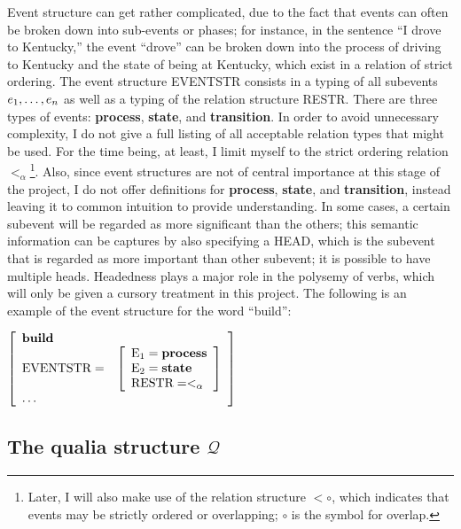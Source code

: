 \documentclass[12pt]{amsart}
\begin{document}
Event structure can get rather complicated, due to the fact that events can often be broken down into sub-events or phases; for instance, in the sentence ``I drove to Kentucky,'' the event ``drove'' can be broken down into the process of driving to Kentucky and the state of being at Kentucky, which exist in a relation of strict ordering. The event structure EVENTSTR consists in a typing of all subevents $e_1,\mathellipsis,e_n$ as well as a typing of the relation structure RESTR. There are three types of events: {\bf process}, {\bf state}, and {\bf transition}. In order to avoid unnecessary complexity, I do not give a full listing of all acceptable relation types that might be used. For the time being, at least, I limit myself to the strict ordering relation $<_\alpha$\footnote{Later, I will also make use of the relation structure $<\circ$, which indicates that events may be strictly ordered or overlapping; $\circ$ is the symbol for overlap.}. Also, since event structures are not of central importance at this stage of the project, I do not offer definitions for {\bf process}, {\bf state}, and {\bf transition}, instead leaving it to common intuition to provide understanding. In some cases, a certain subevent will be regarded as more significant than the others; this semantic information can be captures by also specifying a HEAD, which is the subevent that is regarded as more important than other subevent; it is possible to have multiple heads. Headedness plays a major role in the polysemy of verbs, which will only be given a cursory treatment in this project. The following is an example of the event structure for the word ``build'':
\par\vspace{5mm}
$\left[
\begin{array}{l l}
\textbf{build} & \\
\text{EVENTSTR} = & \left[ \begin{array}{l}
				\text{E}_1=\textbf{process} \\
				\text{E}_2=\textbf{state} \\
				\text{RESTR}=<_\alpha
				\end{array}\right] \\
\mathellipsis &
\end{array}
\right]$
\par\vspace{5mm}

\subsection{The qualia structure $\mathcal{Q}$}
\end{document}
